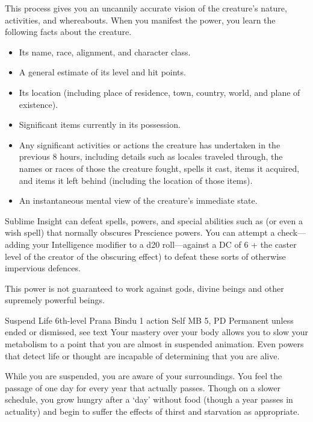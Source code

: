   This process gives you an uncannily accurate vision
  of the creature's nature,
  activities,
  and whereabouts.
  When you manifest the power,
  you learn the following facts about the creature.
  \begin{itemize}
    \item Its name, race, alignment, and character class.
    \item A general estimate of its level and hit points.
    \item Its location (including place of residence, town,
          country, world, and plane of existence).
    \item Significant items currently in its possession.
    \item Any significant activities or actions the creature
          has undertaken in the previous 8 hours,
          including details such as locales traveled through,
          the names or races of those the creature fought,
          spells it cast,
          items it acquired,
          and items it left behind
          (including the location of those items).
    \item An instantaneous mental view of the creature's
          immediate state.
  \end{itemize}

  Sublime Insight can defeat spells,
  powers,
  and special abilities such as 
  (or even a wish spell)
  that normally obscures Prescience powers.
  You can attempt a check---adding your
  Intelligence modifier to a d20 roll---against
  a DC of 6 + the caster level of the
  creator of the obscuring effect)
  to defeat these sorts of otherwise impervious defences.

  This power is not guaranteed to work against gods, divine beings
  and other supremely powerful beings.

\DndPowerHeader%
  {Suspend Life}
  {6th-level Prana Bindu}
  {1 action}
  {Self}
  {MB 5, PD \lvlsix}
  {Permanent unless ended or dismissed, see text}
  Your mastery over your body allows you to slow your
  metabolism to a point
  that you are almost in suspended animation.
  Even powers that detect life or thought are
  incapable of determining that you are alive.

  While you are suspended,
  you are aware of your surroundings.
  You feel the passage of one day
  for every year that actually passes.
  Though on a slower schedule,
  you grow hungry after a `day' without food
  (though a year passes in actuality)
  and begin to suffer the effects of
  thirst and starvation as appropriate.
  
